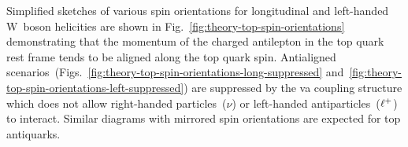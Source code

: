 Simplified sketches of various spin orientations for longitudinal and left-handed $\mathrm{W}$~boson helicities are shown in Fig.~\ref{fig:theory-top-spin-orientations} demonstrating that the momentum of the charged antilepton in the top quark rest frame tends to be aligned along the top quark spin. Antialigned scenarios~(Figs.~\ref{fig:theory-top-spin-orientations-long-suppressed} and~\ref{fig:theory-top-spin-orientations-left-suppressed}) are suppressed by the \gls{va} coupling structure which does not allow right-handed particles~($\nu$) or left-handed antiparticles~($\ell^{+}$) to interact. Similar diagrams with mirrored spin orientations are expected for top antiquarks.


